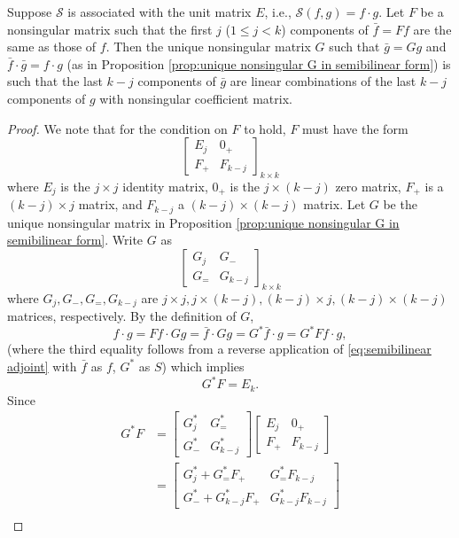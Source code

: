 \documentclass[11pt, oneside, a4paper]{article}
\begin{document}
\begin{prop}\label{prop:last k-j components linear combination}
    Suppose $\mathcal{S}$ is associated with the unit matrix $E$, i.e., $\mathcal{S}(f,g)=f\cdot g$. Let $F$ be a nonsingular matrix such that the first $j$ ($1\leq j<k$) components of $\bar{f}=Ff$ are the same as those of $f$. Then the unique nonsingular matrix $G$ such that $\bar{g}=Gg$ and $\bar{f}\cdot \bar{g}=f\cdot g$ (as in Proposition \ref{prop:unique nonsingular G in semibilinear form}) is such that the last $k-j$ components of $\bar{g}$ are linear combinations of the last $k-j$ components of $g$ with nonsingular coefficient matrix.
\end{prop}
\begin{proof}
    We note that for the condition on $F$ to hold, $F$ must have the form
\[\begin{bmatrix}E_j & 0_+\\
F_+ & F_{k-j}\end{bmatrix}_{k\times k}\]
where $E_j$ is the $j\times j$ identity matrix, $0_+$ is the $j\times (k-j)$ zero matrix, $F_+$ is a $(k-j)\times j$ matrix, and $F_{k-j}$ a $(k-j)\times (k-j)$ matrix. Let $G$ be the unique nonsingular matrix in Proposition \ref{prop:unique nonsingular G in semibilinear form}. Write $G$ as
\[\begin{bmatrix}G_j & G_-\\
G_= & G_{k-j}\end{bmatrix}_{k\times k}\]
where $G_j, G_-, G_=, G_{k-j}$ are $j\times j, j\times (k-j), (k-j)\times j, (k-j)\times (k-j)$ matrices, respectively. By the definition of $G$,
\[f\cdot g = Ff\cdot Gg = \bar{f}\cdot Gg = G^*\bar{f}\cdot g = G^*Ff\cdot g,\]
(where the third equality follows from a reverse application of \eqref{eq:semibilinear adjoint} with $\bar{f}$ as $f$, $G^*$ as $S$) which implies
\[G^*F = E_k.\]
Since
\begin{align*}
    G^*F &= \begin{bmatrix}
        G^*_j & G^*_=\\
        G^*_- & G^*_{k-j}
    \end{bmatrix}\begin{bmatrix}E_j & 0_+\\
    F_+ & F_{k-j}\end{bmatrix}\\
    &= \begin{bmatrix}
        G^*_j + G^*_= F_+ & G^*_= F_{k-j}\\
        G^*_- + G^*_{k-j} F_+ & G^*_{k-j}F_{k-j}
    \end{bmatrix}\\

\end{align*}
\end{proof}
\end{document}
